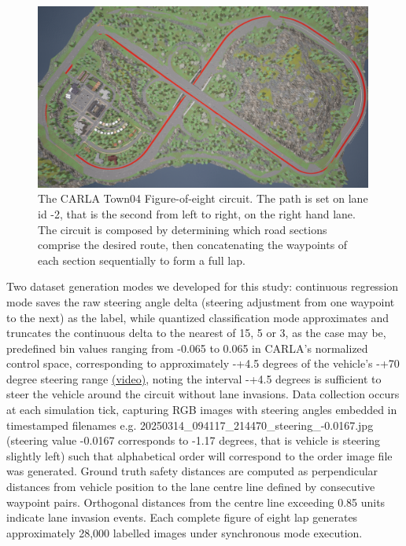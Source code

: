 \begin{figure}[h]
\centering
\includegraphics[width=0.99\textwidth]{Figures/Methods/Town04FigureOfEight.png}
\caption{The CARLA Town04 Figure-of-eight circuit. The path is set on lane id -2, that is the second from left to right, on the right hand lane. The circuit is composed by determining which road sections comprise the desired route, then concatenating the waypoints of each section sequentially to form a full lap.}
\label{fig:Town04FigureOfEight}
\end{figure}

Two dataset generation modes we developed for this study: continuous regression mode saves the raw steering angle delta (steering adjustment from one waypoint to the next) as the label, while quantized classification mode approximates and truncates the continuous delta to the nearest of 15, 5 or 3, as the case may be, predefined bin values ranging from -0.065 to 0.065 in CARLA's normalized control space, corresponding to approximately -+4.5 degrees of the vehicle's -+70 degree steering range \href{https://www.youtube.com/watch?v=cg6hhrpsc5g}{(video)}, noting the interval -+4.5 degrees is sufficient to steer the vehicle around the circuit without lane invasions.
Data collection occurs at each simulation tick, capturing RGB images with steering angles embedded in timestamped filenames e.g. 20250314\_094117\_214470\_steering\_-0.0167.jpg (steering value -0.0167 corresponds to -1.17 degrees, that is vehicle is steering slightly left) such that alphabetical order will correspond to the order image file was generated. Ground truth safety distances are computed as perpendicular distances from vehicle position to the lane centre line defined by consecutive waypoint pairs. Orthogonal distances from the centre line exceeding 0.85 units indicate lane invasion events. Each complete figure of eight lap generates approximately 28,000 labelled images under synchronous mode execution.

